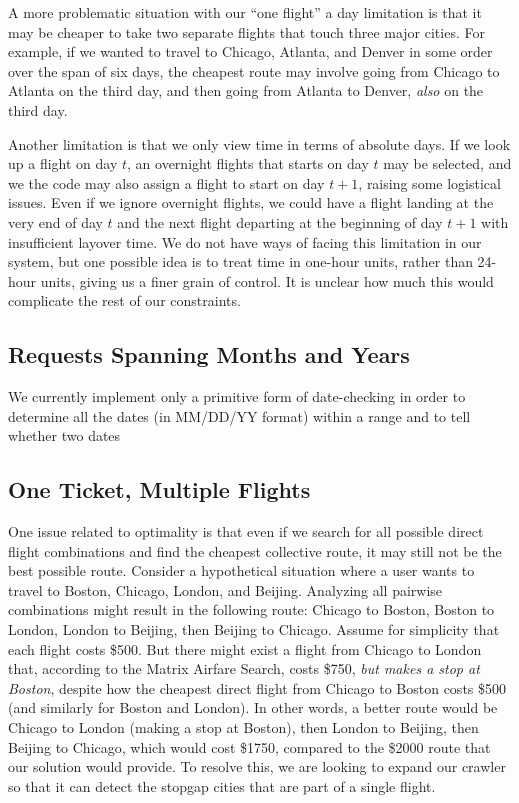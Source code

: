 \documentclass{article}
\begin{document}
A more problematic situation with our ``one flight'' a day limitation is that it may be cheaper to take two separate flights that touch three major
cities. For example, if we wanted to travel to Chicago, Atlanta, and Denver in some order over the span of six days, the cheapest route may involve
going from Chicago to Atlanta on the third day, and then going from Atlanta to Denver, \emph{also} on the third day.

Another limitation is that we only view time in terms of absolute days. If we look up a flight on day $t$, an overnight flights that starts on day $t$
may be selected, and we the code may also assign a flight to start on day $t+1$, raising some logistical issues. Even if we ignore overnight flights,
we could have a flight landing at the very end of day $t$ and the next flight departing at the beginning of day $t+1$ with insufficient layover time.
We do not have ways of facing this limitation in our system, but one possible idea is to treat time in one-hour units, rather than 24-hour units,
giving us a finer grain of control. It is unclear how much this would complicate the rest of our constraints.

\subsection{Requests Spanning Months and Years}

We currently implement only a primitive form of date-checking in order to determine all the dates (in MM/DD/YY format) within a range and to tell
whether two dates

\subsection{One Ticket, Multiple Flights}

One issue related to optimality is that even if we search for all possible direct flight combinations and find the cheapest collective route, it may
still not be the best possible route. Consider a hypothetical situation where a user wants to travel to Boston, Chicago, London, and Beijing.
Analyzing all pairwise combinations might result in the following route: Chicago to Boston, Boston to London, London to Beijing, then Beijing to
Chicago.  Assume for simplicity that each flight costs \$500. But there might exist a flight from Chicago to London that, according to the Matrix
Airfare Search, costs \$750, \emph{but makes a stop at Boston}, despite how the cheapest direct flight from Chicago to Boston costs \$500 (and
similarly for Boston and London). In other words, a better route would be Chicago to London (making a stop at Boston), then London to Beijing, then
Beijing to Chicago, which would cost \$1750, compared to the \$2000 route that our solution would provide. To resolve this, we are looking to expand
our crawler so that it can detect the stopgap cities that are part of a single flight.
\end{document}
